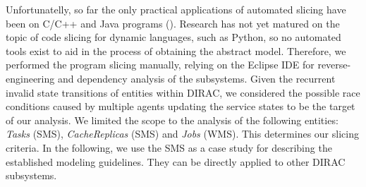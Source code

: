 \documentclass[sort&compress,preprint,3p]{elsarticle}
\begin{document}
Unfortunatelly, so far the only practical
applications of automated slicing have been
on C/C++ and Java programs (\cite{frama_c,codeSurfer,Corbett00bandera}). 
Research has not yet
matured on the topic of code slicing for dynamic languages, such as Python, so no automated tools exist to aid 
in the process of obtaining the abstract model. 
Therefore, we performed the program slicing manually, relying on the Eclipse IDE for 
reverse-engineering and dependency analysis of the subsystems.
Given the recurrent invalid state transitions of entities within DIRAC, 
we considered the possible race conditions caused by multiple agents updating 
the service states to be the target of our analysis. We limited the scope
to the analysis of the following entities: \textit{Tasks} (SMS), \textit{CacheReplicas} (SMS) and \textit{Jobs} (WMS).
This determines our slicing criteria. In the following, we use the SMS as a case study
for describing the established modeling guidelines. They can be 
directly applied to other DIRAC subsystems.
\end{document}
